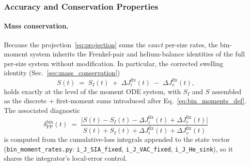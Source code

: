 \subsubsection*{Accuracy and Conservation Properties}
\label{sec:moment_accuracy}

\paragraph{Mass conservation.}
Because the projection~\eqref{eq:projection} sums the
\emph{exact} per-size rates, the bin-moment system inherits the
Frenkel-pair and helium-balance identities of the full per-size system
without modification. In particular, the corrected swelling identity
(Sec.~\ref{sec:mass_conservation})
\begin{equation}\label{eq:swelling_identity_bin}
    S(t) \;=\; S_I(t)
              \;+\; \Delta J_i^{\mathrm{fix}}(t)
              \;-\; \Delta J_v^{\mathrm{fix}}(t),
\end{equation}
holds exactly at the level of the moment ODE system, with $S_I$ and
$S$ assembled as the discrete + first-moment sums introduced after
Eq.~\eqref{eq:bin_moments_def}. The associated diagnostic
\begin{equation}\label{eq:delta_FP_binned}
    \delta_{\mathrm{FP}}^{\mathrm{bin}}(t)
    \;=\;
    \frac{\bigl|S(t) - S_I(t)
         - \Delta J_i^{\mathrm{fix}}(t)
         + \Delta J_v^{\mathrm{fix}}(t)\bigr|}
         {S(t) + S_I(t)
         + \Delta J_i^{\mathrm{fix}}(t)
         + \Delta J_v^{\mathrm{fix}}(t)}
\end{equation}
is computed from the cumulative-loss integrals appended to the state
vector (\texttt{bin\_moment\_rates.py}: \texttt{i\_J\_SIA\_fixed},
\texttt{i\_J\_VAC\_fixed}, \texttt{i\_J\_He\_sink}), so it shares the
integrator's local-error control.

